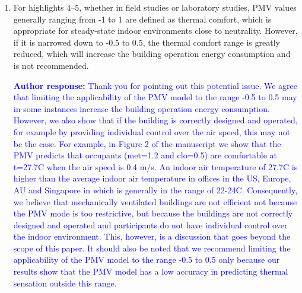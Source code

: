 \documentclass[a4paper, 10pt]{letter}
\newcommand{\response}[1]{\textcolor{blue}{\textbf{Author response:} #1}}
\begin{document}
\begin{letter}
\begin{enumerate}
            \response{
            We agree with the reviewer that the PMV model is applicable to steady-state indoor thermal environments that do not deviate too much from neutrality.
            However, the PMV model is widely used in the scientific literature to predict thermal sensation in a wide range of thermal environments.
            While the ISO 7730 specifies that the PMV model should only be used when its absolute value is lower than 2, the ASHRAE 55 does not specify the range of applicability of the PMV model.
            Consequently, as preiously explained we decided to include all the data in the ASHRAE Global Thermal Comfort Database II v2.1 in the analysis.
            We, however, tried to further analyze the accuracy of the PMV model in predicting thermal sensation within its range of applicability, for example in Table 1 where we present the F1 score of the PMV model in predicting thermal sensation when its absolute value is lower than 1.5.
            }

            \item For highlights 4--5, whether in field studies or laboratory studies, PMV values generally ranging from -1 to 1 are defined as thermal comfort, which is appropriate for steady-state indoor environments close to neutrality.
            However, if it is narrowed down to -0.5 to 0.5, the thermal comfort range is greatly reduced, which will increase the building operation energy consumption and is not recommended.

            \response{
            Thank you for pointing out this potential issue.
            We agree that limiting the applicability of the PMV model to the range -0.5 to 0.5 may in some instances increase the building operation energy consumption.
            However, we also show that if the building is correctly designed and operated, for example by providing individual control over the air speed, this may not be the case.
            For example, in Figure 2 of the manuscript we show that the PMV predicts that occupants (met=1.2 and clo=0.5) are comfortable at t=27.7C when the air speed is 0.4 m/s.
            An indoor air temperature of 27.7C is higher than the average indoor air temperature in offices in the US, Europe, AU and Singapore in which is generally in the range of 22-24C.
            Consequently, we believe that mechanically ventilated buildings are not efficient not because the PMV mode is too restrictive, but because the buildings are not correctly designed and operated and participants do not have individual control over the indoor environment.
            This, however, is a discussion that goes beyond the scope of this paper.
            It should also be noted that we recommend limiting the applicability of the PMV model to the range -0.5 to 0.5 only because our results show that the PMV model has a low accuracy in predicting thermal sensation outside this range.
            }


\end{enumerate}
\end{letter}
\end{document}
